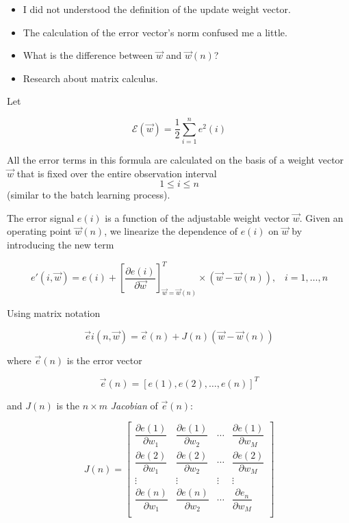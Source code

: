 \documentclass[twocolumn]{article}
\begin{document}
\begin{itemize}
	\item I did not understood the definition of the update weight vector.
	\item The calculation of the error vector's norm confused me a little.
	\item What is the difference between $ \vec{w} $ and $ \vec{w} (n) $?
	\item Research about matrix calculus.
\end{itemize}

Let

$$ \mathcal{E} ( \vec{w}) = \dfrac{1}{2} \sum_{i = 1}^{n} e^{2} (i) $$

All the error terms in this formula are calculated on the basis of a weight vector $ \vec{w} $ that is fixed over the entire observation interval $$ 1 \leq i \leq n $$ (similar to the batch learning process).

The error signal $ e (i) $ is a function of the adjustable weight vector $ \vec{w} $. Given an operating point $ \vec{w} (n) $, we linearize the dependence of $ e (i) $ on $ \vec{w} $ by introducing the new term

$$ e' (i, \vec{w}) = e (i) + \left[ \dfrac{\partial e (i)}{\partial \vec{w}} \right]_{ \vec{w} = \vec{w} (n)}^{T} \times ( \vec{w} - \vec{w} (n)), \;\;\; i = 1,\ldots, n $$

Using matrix notation

$$ \vec{e}i (n, \vec{w}) = \vec{e} (n) + J (n) ( \vec{w} - \vec{w} (n)) $$

\noindent where $ \vec{e} (n) $ is the error vector

$$ \vec{e} (n) = \left[ e (1), e (2), \ldots, e (n) \right]^{T} $$

and $ J (n) $ is the $ n \times m $ \textit{Jacobian} of $ \vec{e} (n) $:

$$ J (n) = 
\begin{bmatrix}
	\dfrac{\partial e (1)}{\partial w_{1}} & \dfrac{\partial e (1)}{\partial w_{2}} & \cdots & \dfrac{\partial e (1)}{\partial w_{M}} \\
	\dfrac{\partial e (2)}{\partial w_{1}} & \dfrac{\partial e (2)}{\partial w_{2}} & \cdots & \dfrac{\partial e (2)}{\partial w_{M}} \\
	\vdots & \vdots & \vdots & \vdots \\
	\dfrac{\partial e (n)}{\partial w_{1}} & \dfrac{\partial e (n)}{\partial w_{2}} & \cdots & \dfrac{\partial e_{n}}{\partial w_{M}} \\
\end{bmatrix}
$$
\end{document}
